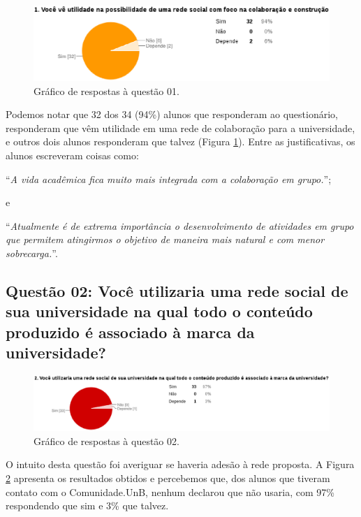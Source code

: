 \begin{figure}[h!]
    \centering
    \includegraphics[keepaspectratio=true,scale=0.55]
      {figuras/p1.eps}
    \caption{Gráfico de respostas à questão 01.}
    \label{response:1}
\end{figure}

Podemos notar que 32 dos 34 (94\%) alunos que responderam ao questionário, responderam
que vêm utilidade em uma rede de colaboração para a universidade, e outros dois alunos
responderam que talvez (Figura \ref{response:1}).
%
Entre as justificativas, os alunos escreveram coisas como:

\begin{center}
``\textit{A vida acadêmica fica muito mais integrada com a colaboração em grupo.}'';
\end{center}

e

\begin{center}
``\textit{Atualmente é de extrema importância o desenvolvimento de atividades
em grupo que permitem atingirmos o objetivo de maneira mais natural e com menor
sobrecarga.}''.
\end{center}

\subsection*{Questão 02: Você utilizaria uma rede social de sua universidade na
qual todo o conteúdo produzido é associado à marca da universidade?}

\begin{figure}[h!]
    \centering
    \includegraphics[keepaspectratio=true,scale=0.55]
      {figuras/p2.eps}
    \caption{Gráfico de respostas à questão 02.}
    \label{response:2}
\end{figure}

O intuito desta questão foi averiguar se haveria adesão à rede proposta. A Figura
\ref{response:2} apresenta os resultados obtidos e percebemos que, dos alunos que
tiveram contato com o Comunidade.UnB, nenhum declarou que não usaria, com 97\%
respondendo que sim e 3\% que talvez.

